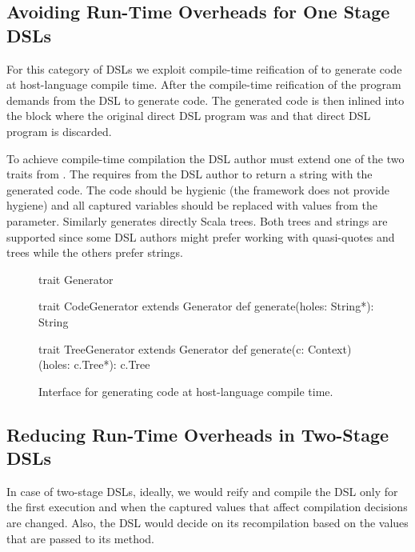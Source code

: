 \subsection{Avoiding Run-Time Overheads for One Stage DSLs}
\label{sec:avoiding-run-time-overheads-one-stage}

For this category of DSLs we exploit compile-time reification of \yy to generate
 code at host-language compile time. After the compile-time reification of the program
 \yy demands from the DSL to generate code. The generated code is then inlined into
 the block where the original direct DSL program was and that direct DSL program
 is discarded.

To achieve compile-time compilation the DSL author must extend one of the two traits
 from . The  requires from the DSL author
 to return a string with the generated code. The code should be hygienic
 (the framework does not provide hygiene) and all captured variables should be replaced with
 values from the  parameter. Similarly  generates directly
 Scala trees. Both trees and strings are supported since some DSL authors might prefer
 working with quasi-quotes and trees while the others prefer strings.

\begin{figure}
\begin{listingtiny}
trait Generator

trait CodeGenerator extends Generator {
  def generate(holes: String*): String
}

trait TreeGenerator extends Generator {
  def generate(c: Context)(holes: c.Tree*): c.Tree
}
\end{listingtiny}
\caption{Interface for generating code at host-language compile time.}
  \label{fig:generator-traits}
\end{figure}


\subsection{Reducing Run-Time Overheads in Two-Stage DSLs}
\label{sec:worfklow-for-reducing-run-time-overheads-in-multi-stage}

In case of two-stage DSLs, ideally, we would reify and compile the DSL only
for the first execution and when the captured values that affect compilation
decisions are changed. Also, the DSL would decide on its recompilation based on
the values that are passed to its  method.

